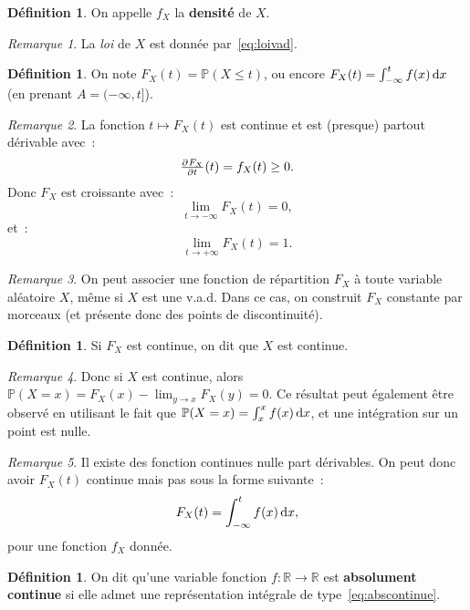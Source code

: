 \documentclass{article}
\renewcommand{\P}{\mathbb P}
\newcommand{\R}{\mathbb R}
\theoremstyle{definition}
\newtheorem{déf}[thm]{Définition}
\theoremstyle{remark}
\newtheorem*{rmq}{Remarque}
\begin{document}
		\begin{déf} On appelle $f_X$ la \textbf{densité} de $X$. \end{déf}

		\begin{rmq} La \emph{loi} de $X$ est donnée par~\eqref{eq:loivad}. \end{rmq}

		\begin{déf} On note $F_X(t) = \P(X \leq t)$, ou encore $F_X(t) = \int_{-\infty}^tf(x)\dif x$ (en prenant $A = (-\infty, t]$). \end{déf}

		\begin{rmq} La fonction $t \mapsto F_X(t)$ est continue et est (presque) partout dérivable avec~:
		\[\pd{F_X}t(t) = f_X(t) \geq 0.\]
		Donc $F_X$ est croissante avec~:
		\[\lim_{t \to -\infty}F_X(t) = 0,\]
		et~:
		\[\lim_{t \to +\infty}F_X(t) = 1.\]
		\end{rmq}

		\begin{rmq} On peut associer une fonction de répartition $F_X$ à toute variable aléatoire $X$, même si $X$ est une v.a.d. Dans ce cas, on construit $F_X$
		constante par morceaux (et présente donc des points de discontinuité). \end{rmq}

		\begin{déf} Si $F_X$ est continue, on dit que $X$ est continue. \end{déf}

		\begin{rmq} Donc si $X$ est continue, alors $\P(X = x) = F_X(x) - \lim_{y \to x}F_X(y) = 0$. Ce résultat peut également être observé en utilisant le fait
		que $\P(X = x) = \int_x^x f(x)\dif x$, et une intégration sur un point est nulle. \end{rmq}

		\begin{rmq} Il existe des fonction continues nulle part dérivables. On peut donc avoir $F_X(t)$ continue mais pas sous la forme suivante~:
		\begin{equation}\label{eq:abscontinue}
			F_X(t) = \int_{-\infty}^tf(x)\dif x,
		\end{equation}
		pour une fonction $f_X$ donnée.
		\end{rmq}

		\begin{déf} On dit qu'une variable fonction $f : \R \to \R$ est \textbf{absolument continue} si elle admet une représentation intégrale de
		type~\eqref{eq:abscontinue}. \end{déf}
\end{document}
